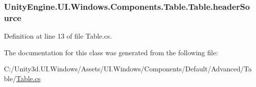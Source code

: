 \subsubsection[{header\+Source}]{ Unity\+Engine.\+U\+I.\+Windows.\+Components.\+Table.\+Table.\+header\+Source}\label{class_unity_engine_1_1_u_i_1_1_windows_1_1_components_1_1_table_1_1_table_ab480689b9f751fb9a9dc1f71e7fad8e1}


Definition at line 13 of file Table.\+cs.



The documentation for this class was generated from the following file\+:\begin{DoxyCompactItemize}
\item 
C\+:/\+Unity3d.\+U\+I.\+Windows/\+Assets/\+U\+I.\+Windows/\+Components/\+Default/\+Advanced/\+Table/\hyperlink{_table_8cs}{Table.\+cs}\end{DoxyCompactItemize}
